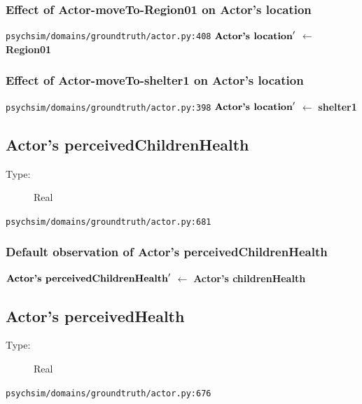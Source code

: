 \documentclass{article}%
\begin{document}
%
\subsubsection{Effect of Actor{-}moveTo{-}Region01 on Actor's location}%
\label{ssubsec:Effect of Actor{-}moveTo{-}Region01 on Actor's location}%
\begin{flushleft}%
\verb|psychsim/domains/groundtruth/actor.py:408|%
\linebreak%
$\mbox{\textbf{Actor's location}} '$%
$\leftarrow$%
\textbf{Region01}%
\end{flushleft}

%
\subsubsection{Effect of Actor{-}moveTo{-}shelter1 on Actor's location}%
\label{ssubsec:Effect of Actor{-}moveTo{-}shelter1 on Actor's location}%
\begin{flushleft}%
\verb|psychsim/domains/groundtruth/actor.py:398|%
\linebreak%
$\mbox{\textbf{Actor's location}} '$%
$\leftarrow$%
\textbf{shelter1}%
\end{flushleft}

%
\subsection{Actor's perceivedChildrenHealth}%
\label{subsec:Actor's perceivedChildrenHealth}%
\begin{description}%
\item[Type:]%
Real%
\end{description}%
\begin{flushleft}%
\verb|psychsim/domains/groundtruth/actor.py:681|%
\end{flushleft}%
\subsubsection{Default observation of Actor's perceivedChildrenHealth}%
\label{ssubsec:Default observation of Actor's perceivedChildrenHealth}%
\begin{flushleft}%
$\mbox{\textbf{Actor's perceivedChildrenHealth}} '$%
$\leftarrow$%
\textbf{Actor's childrenHealth}%
\end{flushleft}

%
\subsection{Actor's perceivedHealth}%
\label{subsec:Actor's perceivedHealth}%
\begin{description}%
\item[Type:]%
Real%
\end{description}%
\begin{flushleft}%
\verb|psychsim/domains/groundtruth/actor.py:676|%
\end{flushleft}%
\end{document}
